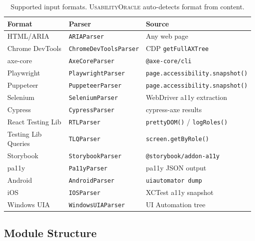 \documentclass[11pt,twocolumn]{article}
\theoremstyle{definition}
\newcommand{\tool}{\textsc{UsabilityOracle}}
\begin{document}
\begin{table}[t]
\centering
\caption{Supported input formats. \tool{} auto-detects format from content.}
\label{tab:formats}
\scriptsize
\begin{tabular}{@{}llp{3.2cm}@{}}
\toprule
\textbf{Format} & \textbf{Parser} & \textbf{Source} \\
\midrule
HTML/ARIA       & \texttt{ARIAParser}       & Any web page \\
Chrome DevTools & \texttt{ChromeDevToolsParser} & CDP \texttt{getFullAXTree} \\
axe-core        & \texttt{AxeCoreParser}    & \texttt{@axe-core/cli} \\
Playwright      & \texttt{PlaywrightParser} & \texttt{page.accessibility.snapshot()} \\
Puppeteer       & \texttt{PuppeteerParser}  & \texttt{page.accessibility.snapshot()} \\
Selenium        & \texttt{SeleniumParser}   & WebDriver a11y extraction \\
Cypress         & \texttt{CypressParser}    & cypress-axe results \\
React Testing Lib & \texttt{RTLParser}     & \texttt{prettyDOM()} / \texttt{logRoles()} \\
Testing Lib Queries & \texttt{TLQParser}   & \texttt{screen.getByRole()} \\
Storybook       & \texttt{StorybookParser}  & \texttt{@storybook/addon-a11y} \\
pa11y           & \texttt{Pa11yParser}      & pa11y JSON output \\
Android         & \texttt{AndroidParser}    & \texttt{uiautomator dump} \\
iOS             & \texttt{IOSParser}        & XCTest a11y snapshot \\
Windows UIA     & \texttt{WindowsUIAParser} & UI Automation tree \\
\bottomrule
\end{tabular}
\end{table}

\subsection{Module Structure}
\end{document}
